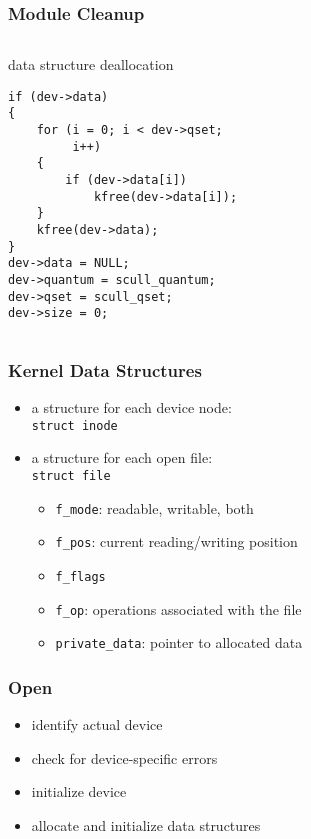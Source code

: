 \documentclass[dvipsnames]{beamer}
\begin{document}
\begin{frame}[fragile]
  \frametitle{Module Cleanup}

  \begin{columns}

    \begin{exampleblock}{data structure deallocation}
      \begin{lstlisting}
if (dev->data)
{
    for (i = 0; i < dev->qset;
         i++)
    {
        if (dev->data[i])
            kfree(dev->data[i]);
    }
    kfree(dev->data);
}
dev->data = NULL;
dev->quantum = scull_quantum;
dev->qset = scull_qset;
dev->size = 0;
      \end{lstlisting}
    \end{exampleblock}
  \end{columns}
\end{frame}

\begin{frame}[fragile]
  \frametitle{Kernel Data Structures}

  \begin{itemize}
    \item a structure for each device node:\\
      \lstinline|struct inode|

    \medskip
    \item a structure for each open file:\\
      \lstinline|struct file|
    \begin{itemize}
      \item \lstinline|f_mode|: readable, writable, both
      \item \lstinline|f_pos|: current reading/writing position
      \item \lstinline|f_flags|
      \item \lstinline|f_op|: operations associated with the file
      \item \lstinline|private_data|: pointer to allocated data
    \end{itemize}
  \end{itemize}
\end{frame}

\begin{frame}
  \frametitle{Open}

  \begin{itemize}
    \item identify actual device
    \item check for device-specific errors
    \item initialize device
    \item allocate and initialize data structures
  \end{itemize}
\end{frame}
\end{document}
